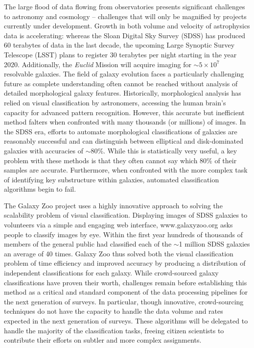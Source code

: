 


The large flood of data flowing from observatories presents significant challenges to astronomy and cosmology -- challenges that will only be magnified by projects currently under development. Growth in both volume and velocity of astrophysics data is accelerating: whereas the Sloan Digital Sky Survey (SDSS) has produced 60 terabytes of data in the last decade, the upcoming Large Synoptic Survey Telescope (LSST) plans to register 30 terabytes per night starting in the year 2020. Additionally, the \textit{Euclid} Mission will acquire imaging for $\sim5\times10^7$ resolvable galaxies. The field of galaxy evolution faces a particularly challenging future as complete understanding often cannot be reached without analysis of detailed morphological galaxy features. Historically, morphological analysis has relied on visual classification by astronomers, accessing the human brain’s capacity for advanced pattern recognition. However, this accurate but inefficient method falters when confronted with many thousands (or millions) of images. In the SDSS era, efforts to automate morphological classifications of galaxies \citep[e.g.,][]{Conselice2000,Lotz2004} are reasonably successful and can distinguish between elliptical and disk-dominated galaxies with accuracies of $\sim$80\%. While this is statistically very useful, a key problem with these methods is that they often cannot say which 80\% of their samples are accurate. Furthermore, when confronted with the more complex task of identifying key substructure within galaxies, automated classification algorithms begin to fail.

The Galaxy Zoo project uses a highly innovative approach to solving the scalability problem of visual classification. Displaying images of SDSS galaxies to volunteers via a simple and engaging web interface, www.galaxyzoo.org asks people to classify images by eye. Within the first year hundreds of thousands of members of the general public had classified each of the $\sim$1 million SDSS galaxies an average of 40 times. Galaxy Zoo thus solved both the visual classification problem of time efficiency and improved accuracy by producing a distribution of independent classifications for each galaxy. While crowd-sourced galaxy classifications have proven their worth, challenges remain before establishing this method as a critical and standard component of the data processing pipelines for the next generation of surveys. In particular, though innovative, crowd-sourcing techniques do not have the capacity to handle the data volume and rates expected in the next generation of surveys. These algorithms will be delegated to handle the majority of the classification tasks, freeing citizen scientists to contribute their efforts on subtler and more complex assignments. 

